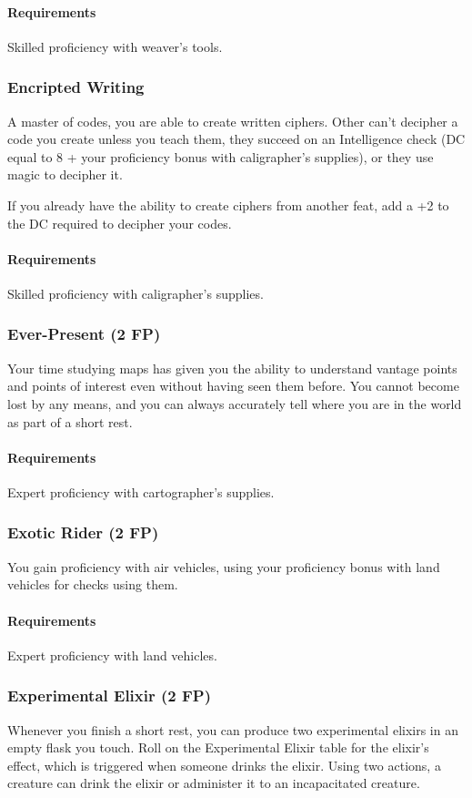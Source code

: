     \paragraph{Requirements} Skilled proficiency with weaver's tools.
\subsubsection{Encripted Writing} \label{feat::encriptedwriting}
    A master of codes, you are able to create written ciphers.
    Other can't decipher a code you create unless you teach them, they succeed on an Intelligence check (DC equal to 8 + your proficiency bonus with caligrapher's supplies), or they use magic to decipher it.

    If you already have the ability to create ciphers from another feat, add a +2 to the DC required to decipher your codes.
    \paragraph{Requirements} Skilled proficiency with caligrapher's supplies.
\subsubsection{Ever-Present (2 FP)} \label{feat::everpresent}
    Your time studying maps has given you the ability to understand vantage points and points of interest even without having seen them before.
    You cannot become lost by any means, and you can always accurately tell where you are in the world as part of a short rest.
    \paragraph{Requirements} Expert proficiency with cartographer's supplies.
\subsubsection{Exotic Rider (2 FP)} \label{feat::exoticrider}
    You gain proficiency with air vehicles, using your proficiency bonus with land vehicles for checks using them.
    \paragraph{Requirements} Expert proficiency with land vehicles.
\subsubsection{Experimental Elixir (2 FP)} \label{feat::experimentalelixir}
    Whenever you finish a short rest, you can produce two experimental elixirs in an empty flask you touch.
    Roll on the Experimental Elixir table for the elixir's effect, which is triggered when someone drinks the elixir.
    Using two actions, a creature can drink the elixir or administer it to an incapacitated creature.

